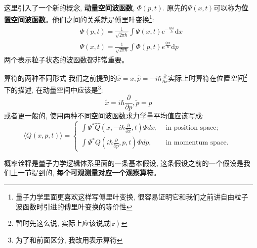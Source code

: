 \documentclass[a4paper,zihao=-4,linespread=1]{ctexrep}
\begin{document}
    这里引入了一个新的概念, \textbf{动量空间波函数}, $\Phi(p,t)$. 原先的$\Psi(x,t)$可以称为\textbf{位置空间波函数}。他们之间的关系就是傅里叶变换\footnote{量子力学里面更喜欢这样写傅里叶变换, 很容易证明它和我们之前讲自由粒子波函数时引进的傅里叶变换的等价性}:
    \begin{align}
        &\Phi(p,t)=\frac{1}{\sqrt{2\pi\hbar}}\int\Psi(x,t)e^{-\frac{ipx}{\hbar}}\mathrm{d}x\\
        &\Psi(x,t)=\frac{1}{\sqrt{2\pi\hbar}}\int\Phi(p,t)e^{\frac{ipx}{\hbar}}\mathrm{d}p
    \end{align}
    两个表示粒子状态的波函数都非常重要。
    \begin{proposition}{算符的两种不同形式}
        我们之前提到的$\hat x=x,\hat p=-i\hbar\frac{\partial}{\partial x}$实际上时算符在位置空间\footnote{暂时先这么说, 实际上应该说成$\left|\bm{r}\right\rangle$}下的描述, 在动量空间中应该是\footnote{为了和前面区分, 我改用$\tilde{}$表示算符}:
        \[\tilde{x}=i\hbar\frac{\partial}{\partial p},\tilde{p}=p\]
        或者更一般的, 使用两种不同空间波函数求力学量平均值应该写成:
        \begin{equation}
            \langle Q(x, p, t)\rangle=\left\{\begin{array}{ll}
                \int \Psi^{*} \hat{Q}\left(x,-i \hbar \frac{\partial}{\partial x}, t\right) \Psi d x, & \text { in position space; } \\
                \int \Phi^{*} \hat{Q}\left(i \hbar \frac{\partial}{\partial p}, p, t\right) \Phi d p, & \text { in momentum space. }
                \end{array}\right.
        \end{equation}
    \end{proposition}
    概率诠释是量子力学逻辑体系里面的一条基本假设, 这条假设之前的一个假设是我们上一节提到的, \textbf{每个可观测量对应一个观察算符}。
\end{document}
